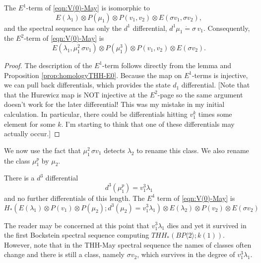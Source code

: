 \begin{prop}
	The $E^1$-term of \eqref{eqn:V(0)-May} is isomorphic to 
	\[
	E(\lambda_1)\otimes P(\mu_1)\otimes P(v_1,v_2)\otimes E(\sigma v_1, \sigma v_2),
	\]
	and the spectral sequence has only the $d^1$ differential, $d^1\mu_1 \dot{=} \sigma\, v_1$. Consequently, the $E^2$-term of \eqref{eqn:V(0)-May} is 
	\[ E(\lambda_1, \mu_1^2\, \sigma v_1)\otimes P(\mu_1^3)\otimes P(v_1,v_2)\otimes E(\sigma v_2). \]
\end{prop}
\begin{proof}
	The description of the $E^1$-term follows directly from the lemma and Proposition \ref{prop:homologyTHH-E0}. 
	Because the map on $E^1$-terms is injective, we can pull back differentials, which provides the state $d_1$ differential. [Note that that the Hurewicz map is NOT injective at the $E^2$-page so the same argument doesn't work for the later differential! This was my mistake in my initial calculation. In particular, there could be differentials hitting $v_1^k$ times some element for some $k$. I'm starting to think that one of these differentials may actually occur.]
\end{proof}
We now use the fact that $\mu_1^2\, \sigma v_1$ detects $\lambda_2$ to rename this class. We also rename the class $\mu_1^p$ by $\mu_2$. 
\begin{prop}
	There is a $d^3$ differential 
	\[ d^3(\mu_1^p)=v_1^3\lambda_1 \]
	and no further differentials of this length. 
	The $E^{4}$ term of \eqref{eqn:V(0)-May} is 
	\[ H_*(E(\lambda_1)\otimes P(v_1)\otimes P(\mu_2 ); d^3(\mu_2)=v_1^3\lambda_1)\otimes E(\lambda_2)\otimes P(v_2)\otimes E(\sigma v_2) \]
\end{prop}
The reader may be concerned at this point that $v_1^3\lambda_1$ dies and yet it survived in the first Bockstein spectral sequence computing $THH_*(BP\langle 2\rangle ; k(1))$. However, note that in the THH-May spectral sequence the names of classes often change and there is still a class, namely $\sigma v_2$, which survives in the degree of $v_1^3\lambda_1$. 
